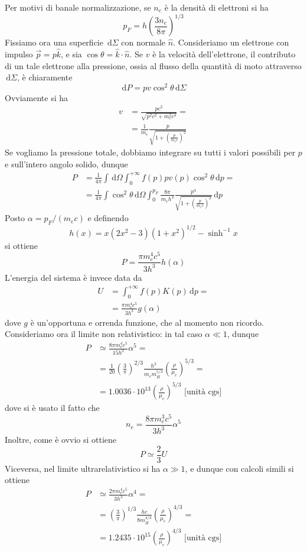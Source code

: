 \documentclass[a4paper,11pt]{article}
\renewcommand{\d}{\mathrm{d}} %
\renewcommand{\d}{\,\mathrm{d}}
\theoremstyle{theorem}
\theoremstyle{definition}
\begin{document}
\begin{itemize}
		Per motivi di banale normalizzazione, se $n_e$ è la densità di elettroni si ha
		\[p_F=h\left(\frac{3n_e}{8\pi}\right)^{1/3}\]
		Fissiamo ora una superficie $\d\Sigma$ con normale $\hat{n}$. Consideriamo un elettrone con impulso $\vec{p}=p\hat{k}$, e sia $\cos\theta=\hat{k}\cdot\hat{n}$. Se $v$ è la velocità dell'elettrone, il contributo di un tale elettrone alla pressione, ossia al flusso della quantità di moto attraverso $\d\Sigma$, è chiaramente
		\[\d P=pv\cos^2\theta\d\Sigma\]
		Ovviamente si ha
		\begin{align*}
			v&=\frac{pc^2}{\sqrt{p^2c^2+m_e^2c^4}}=\\&=\frac{1}{m_e}\frac{p}{\sqrt{1+\left(\frac{p}{m_ec}\right)^2}}
		\end{align*}
		Se vogliamo la pressione totale, dobbiamo integrare su tutti i valori possibili per $p$ e sull'intero angolo solido, dunque
		\begin{align*}
			P&=\frac{1}{4\pi}\int\d\Omega\int_{0}^{+\infty}f(p)pv(p)\cos^2\theta\d p=\\&=\frac{1}{4\pi}\int\cos^2\theta\d\Omega\int_{0}^{p_F}\frac{8\pi}{m_eh^3}\frac{p^4}{\sqrt{1+\left(\frac{p}{m_ec}\right)^2}}\d p
		\end{align*}
		Posto $\alpha=p_F/(m_ec)$ e definendo
		\[h(x)=x(2x^2-3)(1+x^2)^{1/2}-\sinh^{-1}x\]
		si ottiene
		\[P=\frac{\pi m_e^4c^5}{3h^3}h(\alpha)\]
		L'energia del sistema è invece data da
		\begin{align*}
			U&=\int_{0}^{+\infty}f(p)K(p)\d p=\\&=\frac{\pi m_e^4c^5}{3h^3}g(\alpha)
		\end{align*}
		dove $g$ è un'opportuna e orrenda funzione, che al momento non ricordo. Consideriamo ora il limite non relativistico: in tal caso $\alpha\ll 1$, dunque
		\begin{align*}
			P&\simeq\frac{8\pi m_e^4c^5}{15 h^3}\alpha^5=\\&=\frac{1}{20}\left(\frac{3}{\pi}\right)^{2/3}\frac{h^2}{m_em_H^{5/3}}\left(\frac{\rho}{\mu_e}\right)^{5/3}=\\&=1.0036\cdot10^{13}\left(\frac{\rho}{\mu_e}\right)^{5/3}\textrm{ [unità cgs]}
		\end{align*}
		dove si è usato il fatto che
		\[n_e=\frac{8\pi m_e^3c^5}{3h^3}\alpha^5\]
		Inoltre, come è ovvio si ottiene
		\[P\simeq\frac{2}{3}U\]
		Viceversa, nel limite ultrarelativistico si ha $\alpha\gg 1$, e dunque con calcoli simili si ottiene
		\begin{align*}
			P&\simeq\frac{2\pi m_e^4c^5}{3h^3}\alpha^4=\\&=\left(\frac{3}{\pi}\right)^{1/3}\frac{hc}{8m_H^{4/3}}\left(\frac{\rho}{\mu_e}\right)^{4/3}=\\&=1.2435\cdot10^{15}\left(\frac{\rho}{\mu_e}\right)^{4/3}\textrm{ [unità cgs]}

\end{align*}
\end{itemize}
\end{document}

